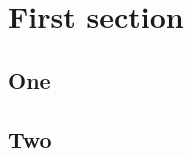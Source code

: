 \documentclass[12pt]{article}
\begin{document}
\section{First section}
\subsection{One}
\lipsum[1-3]
\subsection{Two}
\lipsum[4-6]
\end{document}
